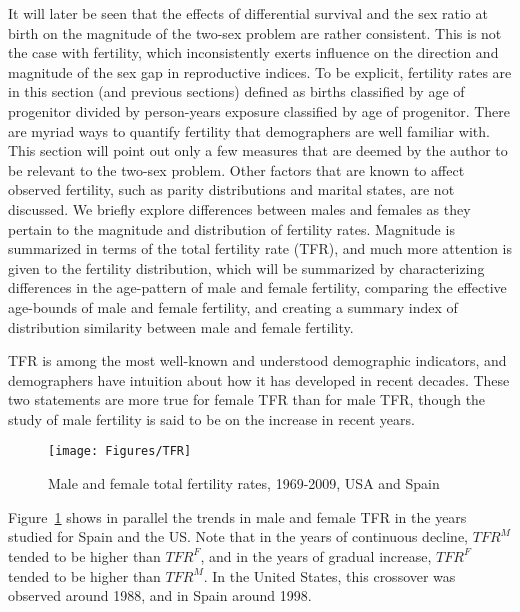  \FloatBarrier
 \label{sec:dimorphASFR}
 
It will later be seen that the effects of differential survival and the
sex ratio at birth on the magnitude of the two-sex problem are rather
consistent. This is not the case with fertility, which inconsistently exerts
influence on the direction and magnitude of the sex gap in reproductive indices.
To be explicit, fertility rates are in this section (and previous sections) defined 
as births classified by age of progenitor divided by person-years exposure classified by age of progenitor.
There are myriad ways to quantify fertility that demographers are well familiar
with. This section will point out only a few measures that are deemed by the
author to be relevant to the two-sex problem. Other factors that are known to
affect observed fertility, such as parity distributions and marital states, are
not discussed. We briefly explore differences between males and females as
they pertain to the magnitude and distribution of fertility rates. Magnitude is summarized in
terms of the total fertility rate (TFR), and much more attention is given to the
fertility distribution, which will be summarized by characterizing differences
in the age-pattern of male and female fertility, comparing the effective
age-bounds of male and female fertility, and creating a summary index of
distribution similarity between male and female fertility.

TFR is among the most well-known and understood demographic indicators, and
demographers have intuition about how it has developed in recent decades. These
two statements are more true for female TFR than for male TFR, though the study
of male fertility is said to be on the increase in recent years.

\begin{figure}[ht!]
        \centering  
          \caption{Male and female total fertility rates, 1969-2009, USA and
          Spain}
           \texttt{[image: Figures/TFR]}
          \label{fig:TFRseries}
\end{figure}

Figure~\ref{fig:TFRseries} shows in parallel the trends in male and female TFR
in the years studied for Spain and the US. Note that
in the years of continuous decline, $TFR^M$ tended to be higher than $TFR^F$,
and in the years of gradual increase, $TFR^F$ tended to be higher than $TFR^M$. In the United States,
this crossover was observed around 1988, and in Spain around 1998. 

